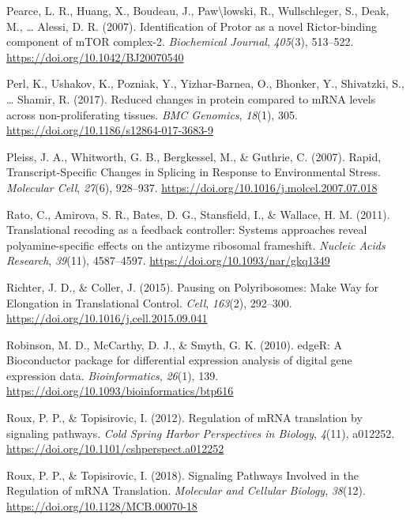 \documentclass[12pt,openany]{book}
\begin{document}
\hypertarget{ref-Pearce2007}{}
Pearce, L. R., Huang, X., Boudeau, J., Paw\textbackslash{}lowski, R.,
Wullschleger, S., Deak, M., \ldots{} Alessi, D. R. (2007).
Identification of Protor as a novel Rictor-binding component of mTOR
complex-2. \emph{Biochemical Journal}, \emph{405}(3), 513--522.
\url{https://doi.org/10.1042/BJ20070540}

\hypertarget{ref-Perl2017}{}
Perl, K., Ushakov, K., Pozniak, Y., Yizhar-Barnea, O., Bhonker, Y.,
Shivatzki, S., \ldots{} Shamir, R. (2017). Reduced changes in protein
compared to mRNA levels across non-proliferating tissues. \emph{BMC
Genomics}, \emph{18}(1), 305.
\url{https://doi.org/10.1186/s12864-017-3683-9}

\hypertarget{ref-Pleiss2007}{}
Pleiss, J. A., Whitworth, G. B., Bergkessel, M., \& Guthrie, C. (2007).
Rapid, Transcript-Specific Changes in Splicing in Response to
Environmental Stress. \emph{Molecular Cell}, \emph{27}(6), 928--937.
\url{https://doi.org/10.1016/j.molcel.2007.07.018}

\hypertarget{ref-Rato2011}{}
Rato, C., Amirova, S. R., Bates, D. G., Stansfield, I., \& Wallace, H.
M. (2011). Translational recoding as a feedback controller: Systems
approaches reveal polyamine-specific effects on the antizyme ribosomal
frameshift. \emph{Nucleic Acids Research}, \emph{39}(11), 4587--4597.
\url{https://doi.org/10.1093/nar/gkq1349}

\hypertarget{ref-Richter2015}{}
Richter, J. D., \& Coller, J. (2015). Pausing on Polyribosomes: Make Way
for Elongation in Translational Control. \emph{Cell}, \emph{163}(2),
292--300. \url{https://doi.org/10.1016/j.cell.2015.09.041}

\hypertarget{ref-Robinson2010}{}
Robinson, M. D., McCarthy, D. J., \& Smyth, G. K. (2010). edgeR: A
Bioconductor package for differential expression analysis of digital
gene expression data. \emph{Bioinformatics}, \emph{26}(1), 139.
\url{https://doi.org/10.1093/bioinformatics/btp616}

\hypertarget{ref-Roux2012}{}
Roux, P. P., \& Topisirovic, I. (2012). Regulation of mRNA translation
by signaling pathways. \emph{Cold Spring Harbor Perspectives in
Biology}, \emph{4}(11), a012252.
\url{https://doi.org/10.1101/cshperspect.a012252}

\hypertarget{ref-Roux2018}{}
Roux, P. P., \& Topisirovic, I. (2018). Signaling Pathways Involved in
the Regulation of mRNA Translation. \emph{Molecular and Cellular
Biology}, \emph{38}(12). \url{https://doi.org/10.1128/MCB.00070-18}
\end{document}
